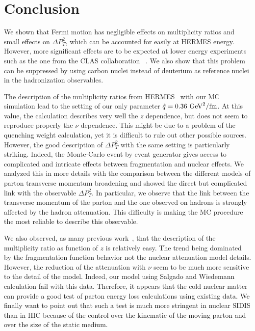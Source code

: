 \section{Conclusion}

We shown that Fermi motion has negligible effects on multiplicity ratios and 
small effects on $\Delta P_T^2$, which can be accounted for easily at HERMES 
energy. However, more significant effects are to be expected at lower energy 
experiments such as the one from the CLAS collaboration~%
\cite{Brooks:2009xg,DupreQNP}. We also show that this problem can be suppressed 
by using carbon nuclei instead of deuterium as reference nuclei in the 
hadronization observables. 

The description of the multiplicity ratios from HERMES~\cite{Airapetian:2007vu} 
with our MC simulation lead to the setting of our only parameter $\qhat = 0.36\ 
\text{GeV}^2/\text{fm}$. At this value, the calculation describes very well the 
$z$ dependence, but does not seem to reproduce properly the $\nu$ dependence. 
This might be due to a problem of the quenching weight calculation, yet it is 
difficult to rule out other possible sources. However, the good description of 
$\Delta P_T^2$ with the same setting is particularly striking. Indeed, the 
Monte-Carlo event by event generator gives access to complicated and intricate 
effects between fragmentation and nuclear effects. We analyzed this in more 
details with the comparison between the different models of parton transverse 
momentum broadening and showed the direct but complicated link with the 
observable $\Delta P_T^2$. In particular, we observe that the link between the 
transverse momentum of the parton and the one observed on hadrons is strongly 
affected by the hadron attenuation. This difficulty is making the MC procedure 
the most reliable to describe this observable. 

We also observed, as many previous work~\cite{Accardi:2009qv}, that the 
description of the multiplicity ratio as function of $z$ is relatively easy. 
The trend being dominated by the fragmentation function behavior not the 
nuclear attenuation model details. However, the reduction of the attenuation 
with $\nu$ seem to be much more sensitive to the detail of the model. Indeed, 
our model using Salgado and Wiedemann calculation fail with this data. 
Therefore, it appears that the cold nuclear matter can provide a good test of 
parton energy loss calculations using existing data. We finally want to point 
out that such a test is much more stringent in nuclear SIDIS than in HIC 
because of the control over the kinematic of the moving parton and over the 
size of the static medium.

